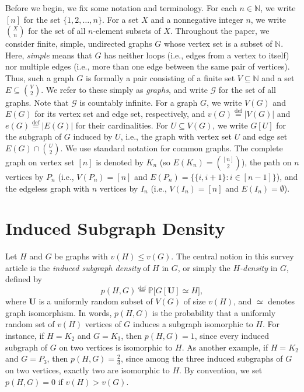 \documentclass{article}
\newcommand*{\defeq}{\stackrel{\mathrm{def}}{=}}
\begin{document}
Before we begin, we fix some notation and terminology.
For each $n \in \mathbb{N}$, we write $[n]$ for the set $\{1,2,\ldots,n\}$.
For a set $X$ and a nonnegative integer $n$, we write $\binom{X}{n}$ for the set of all
$n$-element subsets of $X$.
Throughout the paper, we consider finite, simple, undirected graphs $G$ whose vertex set is a
subset of $\mathbb{N}$. Here, \emph{simple} means that $G$ has neither loops (i.e., edges
from a vertex to itself) nor multiple edges (i.e., more than one edge between the same pair of
vertices). Thus, such a graph $G$ is formally a pair consisting of a finite set $V \subseteq \mathbb{N}$
and a set $E \subseteq \binom{V}{2}$. We refer to these simply as \emph{graphs}, and write
$\mathcal{G}$ for the set of all graphs. Note that $\mathcal{G}$ is countably infinite.
For a graph $G$, we write $V(G)$ and $E(G)$ for its vertex set and edge set, respectively, and
$v(G) \defeq |V(G)|$ and $e(G) \defeq |E(G)|$ for their cardinalities.
For $U \subseteq V(G)$, we write $G[U]$ for the subgraph of $G$ induced by $U$, i.e., the graph with
vertex set $U$ and edge set $E(G) \cap \binom{U}{2}$.
We use standard notation for common graphs. The complete graph on vertex set $[n]$ is denoted by $K_n$
(so $E(K_n) = \binom{[n]}{2}$),
the path on $n$ vertices by $P_n$
(i.e., $V(P_n)=[n]$ and $E(P_n)=\{\{i,i+1\} : i \in [n-1]\}$),
and the edgeless graph with $n$ vertices by $I_n$ (i.e., $V(I_n) = [n]$ and $E(I_n) = \emptyset$).  

\section{Induced Subgraph Density}
\label{sec:induced-subgraph-density}

Let $H$ and $G$ be graphs with $v(H) \leq v(G)$. The central notion in this survey article is the
\emph{induced subgraph density} of $H$ in $G$, or simply the \emph{$H$-density} in $G$, defined by
\[
p(H, G) \defeq \mathbb{P}\big[G[\mathbf{U}] \simeq H\big],
\]
where $\mathbf{U}$ is a uniformly random subset of $V(G)$ of size $v(H)$, and $\simeq$ denotes graph
isomorphism. In words, $p(H,G)$ is the probability that a uniformly random set of $v(H)$ vertices of
$G$ induces a subgraph isomorphic to $H$. For instance, if $H = K_2$ and $G = K_3$, then $p(H,G) = 1$,
since every induced subgraph of $G$ on two vertices is isomorphic to $H$. As another example, if
$H = K_2$ and $G = P_3$, then $p(H,G) = \frac{2}{3}$, since among the three induced subgraphs of $G$ on
two vertices, exactly two are isomorphic to $H$.
By convention, we set $p(H,G) = 0$ if $v(H) > v(G)$.
\end{document}
